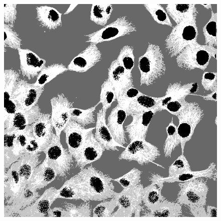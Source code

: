 \documentclass[a4paper]{article}
\begin{document}
\begin{figure}[p]
\begin{minipage}{0.32\textwidth}
\label{fig:km3}
\end{minipage}%
\begin{minipage}{0.32\textwidth}
\centering
\includegraphics[width=1\textwidth]{km4}
\label{fig:km4}
\end{minipage}%
\end{figure}
\end{document}
